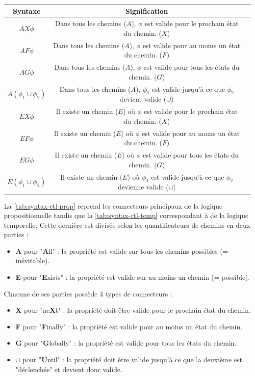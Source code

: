 \documentclass[runningheads,a4paper,10pt]{llncs}
\begin{document}
\begin{center}
\begin{tabular}{|c|c|c|}
  \hline
  Syntaxe & Signification \\
  \hline
  $AX\phi$ & Dans tous les chemins ($A$), $\phi$ est valide pour le prochain état du chemin. ($X$)\\
  $AF\phi$ & Dans tous les chemins ($A$), $\phi$ est valide pour au moins un état du chemin. ($F$) \\
  $AG\phi$ & Dans tous les chemins ($A$), $\phi$ est valide pour tous les états du chemin. ($G$) \\
  $A(\phi_{1} \cup \phi_{2})$ & Dans tous les chemins ($A$), $\phi_{1}$ est valide jusqu'à ce que $\phi_{2}$ devient valide ($\cup$) \\
  \hline
  $EX\phi$ & Il existe un chemin ($E$) où $\phi$ est valide pour le prochain état du chemin. ($X$) \\
  $EF\phi$ & Il existe un chemin ($E$) où $\phi$ est valide pour au moins un état du chemin. ($F$)\\
  $EG\phi$ & Il existe un chemin ($E$) où $\phi$ est valide pour tous les états du chemin. ($G$)\\
  $E(\phi_{1} \cup \phi_{2})$ & Il existe un chemin ($E$) où $\phi_{1}$ est valide jusqu'à ce que $\phi_{2}$ devienne valide ($\cup$) \\
  
 \hline
 
\end{tabular}
 \label{tab:syntax-ctl-temp}
\end{center}

La \autoref{tab:syntax-ctl-prop} reprend les connecteurs principaux de la logique propositionnelle tandis que la \autoref{tab:syntax-ctl-temp} correspondant à de la logique temporelle. Cette dernière est divisée selon les quantificateurs de chemins en deux parties : 
\begin{itemize}
\item \textbf{A} pour "\textbf{A}ll" : la propriété est valide sur tous les chemins possibles (= inévitable).
\item \textbf{E} pour "\textbf{E}xists" : la propriété est valide sur au moins un chemin (= possible).
\end{itemize}

Chacune de ses parties possède 4 types de connecteurs : 
\begin{itemize}
\item \textbf{X} pour "ne\textbf{X}t" : la propriété doit être valide pour le prochain état du chemin. 
\item \textbf{F} pour "\textbf{F}inally" : la propriété est valide pour au moins un état du chemin.
\item \textbf{G} pour "\textbf{G}lobally" : la propriété est valide pour tous les états du chemin.
\item $\pmb{\cup}$ pour "\textbf{U}ntil" : la propriété doit être valide jusqu'à ce que la deuxième est "déclenchée" et devient donc valide. \\
\end{itemize}
\end{document}
